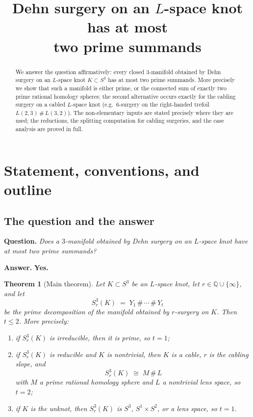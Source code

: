 \documentclass[11pt]{article}
\title{Dehn surgery on an $L$-space knot has at most\\ two prime summands}
\author{}
\date{}
\newtheorem{theorem}{Theorem}[section]
\theoremstyle{definition}
\theoremstyle{remark}
\begin{document}
\maketitle

\begin{abstract}
\noindent We answer the question affirmatively: every closed $3$-manifold
obtained by Dehn surgery on an $L$-space knot $K\subset S^{3}$ has at most two
prime summands.  More precisely we show that such a manifold is either prime,
or the connected sum of exactly two prime rational homology spheres; the
second alternative occurs exactly for the cabling surgery on a cabled
$L$-space knot (e.g.\ $6$-surgery on the right-handed trefoil
$L(2,3)\,\#\,L(3,2)$).  The non-elementary inputs are stated precisely where
they are used; the reductions, the splitting computation for cabling
surgeries, and the case analysis are proved in full.
\end{abstract}

\section{Statement, conventions, and outline}

\subsection{The question and the answer}

\textbf{Question.} \emph{Does a $3$-manifold obtained by Dehn surgery on an
$L$-space knot have at most two prime summands?}

\medskip
\noindent\textbf{Answer.} \textbf{Yes.}

\begin{theorem}[Main theorem]\label{thm:main}
Let $K\subset S^{3}$ be an $L$-space knot, let $r\in\mathbb{Q}\cup\{\infty\}$,
and let
\[
S^{3}_{r}(K)\;=\;Y_{1}\,\#\,\cdots\,\#\,Y_{t}
\]
be the prime decomposition of the manifold obtained by $r$-surgery on $K$.
Then $t\le 2$.  More precisely:
\begin{enumerate}[label=\textup{(\roman*)},leftmargin=2.2em]
 \item if $S^{3}_{r}(K)$ is irreducible, then it is prime, so $t=1$;
 \item if $S^{3}_{r}(K)$ is reducible and $K$ is nontrivial, then $K$ is a
 cable, $r$ is the cabling slope, and
 \[
 S^{3}_{r}(K)\;\cong\;M\,\#\,L
 \]
 with $M$ a prime rational homology sphere and $L$ a nontrivial lens space, so
 $t=2$;
 \item if $K$ is the unknot, then $S^{3}_{r}(K)$ is $S^3$, $S^1\times S^2$, or
 a lens space, so $t=1$.
\end{enumerate}
\end{theorem}
\end{document}
